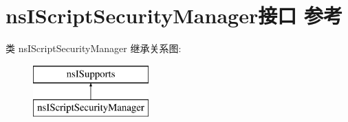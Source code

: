 \hypertarget{interfacens_i_script_security_manager}{}\section{ns\+I\+Script\+Security\+Manager接口 参考}
\label{interfacens_i_script_security_manager}
类 ns\+I\+Script\+Security\+Manager 继承关系图\+:\begin{figure}[H]
\begin{center}
\leavevmode
\includegraphics[height=2.000000cm]{interfacens_i_script_security_manager}
\end{center}
\end{figure}
